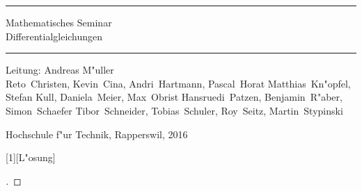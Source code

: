 \documentclass{book}
\begin{document}
\pagestyle{fancy}
\frontmatter
\newcommand\HRule{\noindent\rule{\linewidth}{1.5pt}}
\begin{titlepage}
\HRule
\vspace*{5pt}
\begin{flushright}
{
\LARGE
Mathematisches Seminar\\
\vspace*{20pt}
\Huge
Differentialgleichungen%
}
\vspace*{5pt}
\end{flushright}
\HRule
\begin{flushright}
\vspace{60pt}
\Large
Leitung: Andreas M"uller\\
\vspace{40pt}
\Large
Reto~Christen,
Kevin~Cina,
Andri~Hartmann,
Pascal~Horat %
Matthias~Kn"opfel,
Stefan Kull,
Daniela~Meier,
Max~Obrist %
Hansruedi~Patzen,
Benjamin~R"aber,
Simon~Schaefer %
Tibor~Schneider,
Tobias~Schuler,
Roy~Seitz,
Martin~Stypinski
\end{flushright}
\begin{center}
Hochschule f"ur Technik, Rapperswil, 2016
\end{center}
\end{titlepage}
\hypersetup{
    linktoc=all,
    linkcolor=blue
}
\newenvironment{beispiele}{
\bgroup\smallskip\parindent0pt\bf Beispiele\egroup

\begin{list}{\arabic{beispiel}.}
  {\usecounter{beispiel}
  \setlength{\labelsep}{5mm}
  \setlength{\rightmargin}{0pt}
}}{\end{list}}
\newenvironment{uebungsaufgaben}{
\begin{list}{\arabic{uebungsaufgabe}.}
  {\usecounter{uebungsaufgabe}
  \setlength{\labelwidth}{2cm}
  \setlength{\leftmargin}{0pt}
  \setlength{\labelsep}{5mm}
  \setlength{\rightmargin}{0pt}
  \setlength{\itemindent}{0pt}
}}{\end{list}\vfill\pagebreak}
\newenvironment{teilaufgaben}{
\begin{enumerate}
\renewcommand{\labelenumi}{\alph{enumi})}
}{\end{enumerate}}
\def\swallow#1{
}
[1][L"osung]{%
\begin{proof}[#1]%
\renewcommand{\qedsymbol}{$\bigcirc$}
\BODY
\end{proof}
}
\end{document}
